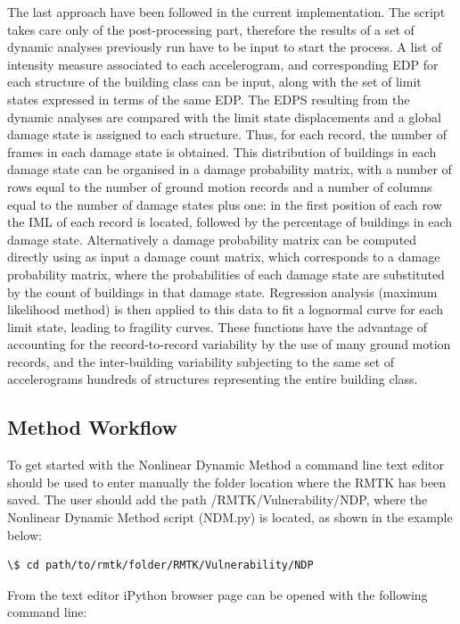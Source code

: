 The last approach have been followed in the current implementation. The script takes care only of the post-processing part, therefore the results of a set of dynamic analyses previously run have to be input to start the process. A list of intensity measure associated to each accelerogram, and corresponding EDP for each structure of the building class can be input, along with the set of limit states expressed in terms of the same EDP. The EDPS resulting from the dynamic analyses are compared with the limit state displacements and a global damage state is assigned to each structure. Thus, for each record, the number of frames in each damage state is obtained. This distribution of buildings in each damage state can be organised in a damage probability matrix, with a number of rows equal to the number of ground motion records and a number of columns equal to the number of damage states plus one: in the first position of each row the IML of each record is located, followed by the percentage of buildings in each damage state. Alternatively a damage probability matrix can be computed directly using as input a damage count matrix, which corresponds to a damage probability matrix, where the probabilities of each damage state are substituted by the count of buildings in that damage state. Regression analysis (maximum likelihood method) is then applied to this data to fit a lognormal curve for each limit state, leading to fragility curves. These functions have the advantage of accounting for the record-to-record variability by the use of many ground motion records, and the inter-building variability subjecting to the same set of accelerograms hundreds of structures representing the entire building class.

\subsection{Method Workflow}
To get started with the Nonlinear Dynamic Method a command line text editor should be used to enter manually the folder location where the RMTK has been saved. The user should add the path /RMTK/Vulnerability/NDP, where the Nonlinear Dynamic Method script (NDM.py) is located, as shown in the example below:

\begin{Verbatim}[frame=single, commandchars=\\\{\}, samepage=true]
\$ cd path/to/rmtk/folder/RMTK/Vulnerability/NDP
\end{Verbatim}

From the text editor iPython browser page can be opened with the following command line:

